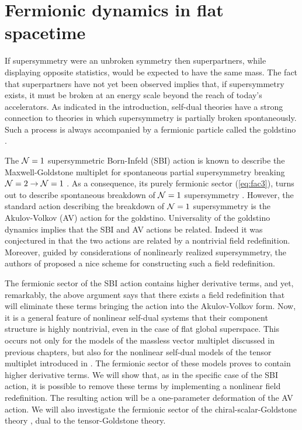 \chapter{Fermionic dynamics in flat spacetime} 
\label{chap:fermionic}

If supersymmetry were an unbroken symmetry then superpartners, while displaying opposite statistics, would be expected to have the same mass. The fact that superpartners have not yet been observed implies that, if supersymmetry exists, it must be broken at an energy scale beyond the reach of today's accelerators. As indicated in the introduction, self-dual theories have a strong connection to theories in which supersymmetry is partially broken spontaneously. Such a process is always accompanied by a fermionic particle called the goldstino \cite{Volkov:1972jx,Volkov:1973ix}.

The ${\cal N} =1$ supersymmetric Born-Infeld (SBI) action \cite{Cecotti:1986gb} is known to describe the Maxwell-Goldstone multiplet for spontaneous partial supersymmetry breaking ${\cal N}=2 \to {\cal N}=1$ \cite{Bagger:1996wp,Rocek:1997hi}. As a consequence, its purely fermionic sector (\ref{eq:fac3}), turns out to describe spontaneous breakdown of ${\cal N}=1$ supersymmetry \cite{Hatanaka:2003cr}. However, the standard action describing the breakdown of ${\cal N}=1$ supersymmetry is the Akulov-Volkov (AV) action \cite{Volkov:1972jx,Volkov:1973ix} for the goldstino. Universality of the goldstino dynamics implies that the SBI and AV actions be related. Indeed it was conjectured in \cite{Hatanaka:2003cr} that the two actions are related by a nontrivial field redefinition. Moreover, guided by considerations of nonlinearly realized supersymmetry, the authors of \cite{Hatanaka:2003cr} proposed a nice scheme for constructing such a field redefinition.

The fermionic sector of the SBI action contains higher derivative terms, and yet, remarkably, the above argument says that there exists a field redefinition that will eliminate these terms bringing the action into the Akulov-Volkov form. Now, it is a general feature of nonlinear self-dual systems that their component structure is highly nontrivial, even in the case of flat global superspace. This occurs not only for the models of the massless vector multiplet discussed in previous chapters, but also for the nonlinear self-dual models of the tensor multiplet introduced in \cite{Kuzenko:2000uh}. The fermionic sector of these models proves to contain higher derivative terms. We will show that, as in the specific case of the SBI action, it is possible to remove these terms by implementing a nonlinear field redefinition. The resulting action will be a one-parameter deformation of the AV action. We will also investigate the fermionic sector of the chiral-scalar-Goldstone theory \cite{Bagger:1997pi,Rocek:1997hi}, dual to the tensor-Goldstone theory.


